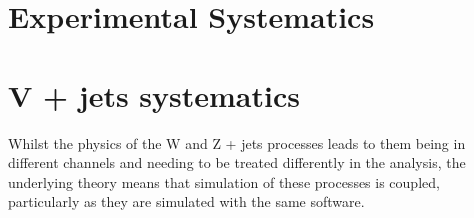 



\section{Experimental Systematics}


\section{V + jets systematics}
\label{sec:vjets}
Whilst the physics of the W and Z + jets processes leads to them being in
different channels and needing to be treated differently in the analysis, the
underlying theory means that simulation of these processes is coupled,
particularly as they are simulated with the same software.

